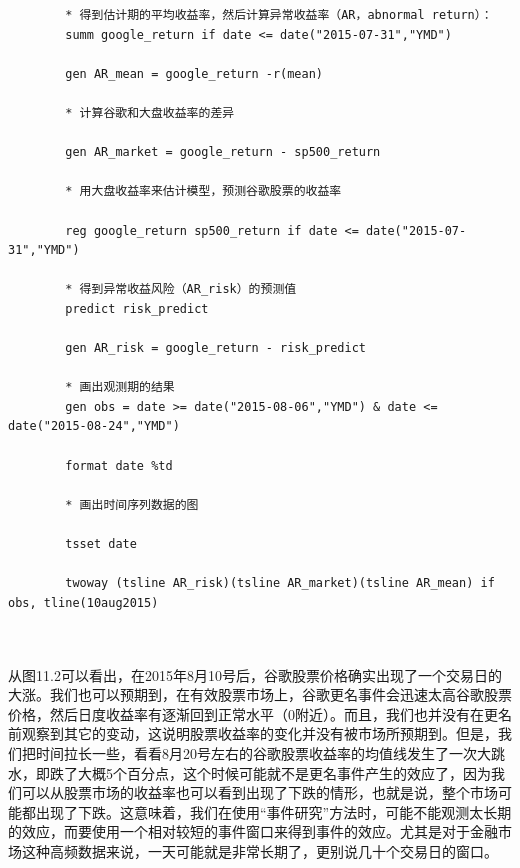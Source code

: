 \documentclass[cn,12pt,math=newtx,citestyle=gb7714-2015,bibstyle=gb7714-2015]{elegantbook}
\begin{document}
	\begin{lstlisting}
		* 得到估计期的平均收益率，然后计算异常收益率（AR，abnormal return）：
		summ google_return if date <= date("2015-07-31","YMD")
		
		gen AR_mean = google_return -r(mean)
		
		* 计算谷歌和大盘收益率的差异
		
		gen AR_market = google_return - sp500_return
		
		* 用大盘收益率来估计模型，预测谷歌股票的收益率
		
		reg google_return sp500_return if date <= date("2015-07-31","YMD")
		
		* 得到异常收益风险（AR_risk）的预测值
		predict risk_predict
		
		gen AR_risk = google_return - risk_predict
		
		* 画出观测期的结果
		gen obs = date >= date("2015-08-06","YMD") & date <= date("2015-08-24","YMD")
		
		format date %td
		
		* 画出时间序列数据的图
		
		tsset date
		
		twoway (tsline AR_risk)(tsline AR_market)(tsline AR_mean) if obs, tline(10aug2015)
		
		
	\end{lstlisting}
	
	从图11.2可以看出，在2015年8月10号后，谷歌股票价格确实出现了一个交易日的大涨。我们也可以预期到，在有效股票市场上，谷歌更名事件会迅速太高谷歌股票价格，然后日度收益率有逐渐回到正常水平（0附近）。而且，我们也并没有在更名前观察到其它的变动，这说明股票收益率的变化并没有被市场所预期到。但是，我们把时间拉长一些，看看8月20号左右的谷歌股票收益率的均值线发生了一次大跳水，即跌了大概5个百分点，这个时候可能就不是更名事件产生的效应了，因为我们可以从股票市场的收益率也可以看到出现了下跌的情形，也就是说，整个市场可能都出现了下跌。这意味着，我们在使用“事件研究”方法时，可能不能观测太长期的效应，而要使用一个相对较短的事件窗口来得到事件的效应。尤其是对于金融市场这种高频数据来说，一天可能就是非常长期了，更别说几十个交易日的窗口。
	
\end{document}
